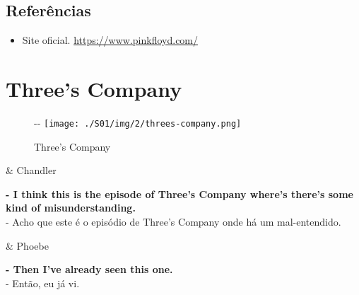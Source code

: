\hypertarget{referuxeancias}{%
\subsection{Referências}\label{referuxeancias}}

\begin{itemize}
\tightlist
\item
  \sloppy Site oficial. \url{https://www.pinkfloyd.com/}
\end{itemize}

\hypertarget{threes-company}{%
\section{Three's Company}\label{threes-company}}

\begin{figure}[!ht]
  \begin{adjustwidth}{-\oddsidemargin-1in}{-\rightmargin}
    \centering
    \texttt{[image: ./S01/img/2/threes-company.png]}
    \caption{Three’s Company\label{fig:three-s-company}}
  \end{adjustwidth}
\end{figure}

\begin{tcolorbox}[enhanced,center upper,
    drop fuzzy shadow southeast, boxrule=0.3pt,
    lower separated=false,
    colframe=black!30!dialogoBorder,colback=white]
\begin{minipage}[c]{0.16\linewidth}
   & \centering \scriptsize{Chandler}
\end{minipage}
\hfill
\begin{minipage}[c]{0.8\linewidth}
  \textbf{- I think this is the episode of Three's Company where's there's some kind of misunderstanding.}\\
  - Acho que este é o episódio de Three's Company onde há um mal-entendido.
\end{minipage}

\medskip
\begin{minipage}[c]{0.16\linewidth}
   & \centering \scriptsize{Phoebe}
\end{minipage}
\hfill
\begin{minipage}[c]{0.8\linewidth}
  \textbf{- Then I've already seen this one.}\\
  - Então, eu já vi.
\end{minipage}
\end{tcolorbox}

